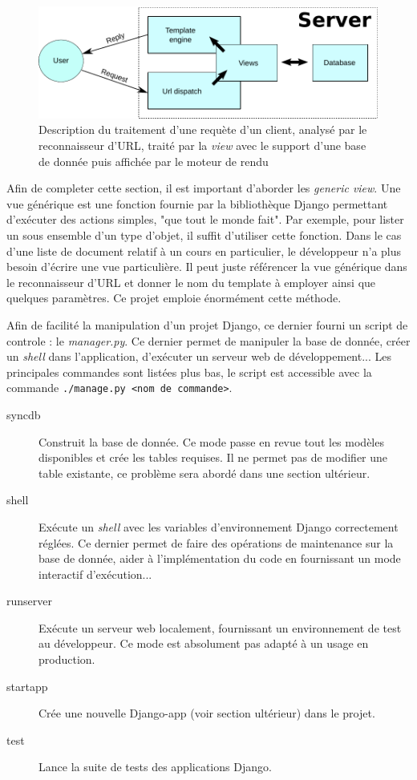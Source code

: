 \documentclass[a4paper,12pt]{article}
\begin{document}
\begin{figure}
  \centering\includegraphics[scale=0.8]{imgs/mvc.pdf}
  \caption{Description du traitement d'une requète d'un client, analysé par
           le reconnaisseur d'URL, traité par la \textit{view} avec le support
           d'une base de donnée puis affichée par le moteur de rendu}
  \label{fig:mvc}
\end{figure}

Afin de completer cette section, il est important d'aborder les \textit{generic view}.
Une vue générique est une fonction fournie par la bibliothèque Django permettant
d'exécuter des actions simples, "que tout le monde fait". Par exemple, pour lister
un sous ensemble d'un type d'objet, il suffit d'utiliser cette fonction. Dans
le cas d'une liste de document relatif à un cours en particulier, le développeur
n'a plus besoin d'écrire une vue particulière. Il peut juste référencer la vue
générique dans le reconnaisseur d'URL et donner le nom du template à employer
ainsi que quelques paramètres. Ce projet emploie énormément cette méthode. 

Afin de facilité la manipulation d'un projet Django, ce dernier fourni un script
de controle : le \textit{manager.py}. Ce dernier permet de manipuler la base de
donnée, créer un \textit{shell} dans l'application, d'exécuter un serveur
web de développement... Les principales commandes sont listées plus bas, le
script est accessible avec la commande \texttt{./manage.py <nom de commande>}.

\begin{description}
\item[syncdb] Construit la base de donnée. Ce mode passe en revue tout les modèles
              disponibles et crée les tables requises. Il ne permet pas de modifier
              une table existante, ce problème sera abordé dans une section ultérieur.
\item[shell] Exécute un \textit{shell} avec les variables d'environnement Django
             correctement réglées. Ce dernier permet de faire des opérations de maintenance
             sur la base de donnée, aider à l'implémentation du code en fournissant
             un mode interactif d'exécution...
\item[runserver] Exécute un serveur web localement, fournissant un environnement
             de test au développeur. Ce mode est absolument pas adapté à un usage en production.
\item[startapp] Crée une nouvelle Django-app (voir section ultérieur) dans le projet.
\item[test] Lance la suite de tests des applications Django.
\end{description}
\end{document}
